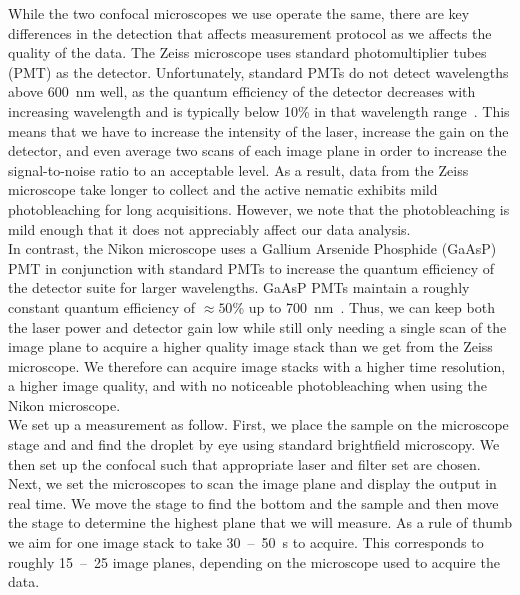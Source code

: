 While the two confocal microscopes we use operate the same, there are key differences in the detection that affects measurement protocol as we affects the quality of the data.
The Zeiss microscope uses standard photomultiplier tubes (PMT) as the detector.
Unfortunately, standard PMTs do not detect wavelengths above 600~nm well, as the quantum efficiency of the detector decreases with increasing wavelength and is typically below 10\% in that wavelength range~\cite{RN263}.
This means that we have to increase the intensity of the laser, increase the gain on the detector, and even average two scans of each image plane in order to increase the signal-to-noise ratio to an acceptable level.
As a result, data from the Zeiss microscope take longer to collect and the active nematic exhibits mild photobleaching for long acquisitions.
However, we note that the photobleaching is mild enough that it does not appreciably affect our data analysis. \\

In contrast, the Nikon microscope uses a Gallium Arsenide Phosphide (GaAsP) PMT in conjunction with standard PMTs to increase the quantum efficiency of the detector suite for larger wavelengths.
GaAsP PMTs maintain a roughly constant quantum efficiency of $\approx 50$\% up to 700~nm~\cite{RN263}.
Thus, we can keep both the laser power and detector gain low while still only needing a single scan of the image plane to acquire a higher quality image stack than we get from the Zeiss microscope.
We therefore can acquire image stacks with a higher time resolution, a higher image quality, and with no noticeable photobleaching when using the Nikon microscope.\\

We set up a measurement as follow.
First, we place the sample on the microscope stage and and find the droplet by eye using standard brightfield microscopy.
We then set up the confocal such that appropriate laser and filter set are chosen.
Next, we set the microscopes to scan the image plane and display the output in real time.
We move the stage to find the bottom and the sample and then move the stage to determine the highest plane that we will measure.
As a rule of thumb we aim for one image stack to take 30~--~50~s to acquire.
This corresponds to roughly 15~--~25 image planes, depending on the microscope used to acquire the data. \\

